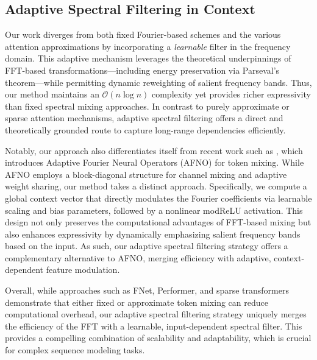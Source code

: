 \subsection{Adaptive Spectral Filtering in Context}
\label{subsec:adaptive_spectral_filtering_context}
Our work diverges from both fixed Fourier-based schemes and the various attention approximations by incorporating a \emph{learnable} filter in the frequency domain. This adaptive mechanism leverages the theoretical underpinnings of FFT-based transformations---including energy preservation via Parseval's theorem---while permitting dynamic reweighting of salient frequency bands. Thus, our method maintains an \(\mathcal{O}(n \log n)\) complexity yet provides richer expressivity than fixed spectral mixing approaches. In contrast to purely approximate or sparse attention mechanisms, adaptive spectral filtering offers a direct and theoretically grounded route to capture long-range dependencies efficiently.

Notably, our approach also differentiates itself from recent work such as \cite{guibas2022adaptivefourierneuraloperators}, which introduces Adaptive Fourier Neural Operators (AFNO) for token mixing. While AFNO employs a block-diagonal structure for channel mixing and adaptive weight sharing, our method takes a distinct approach. Specifically, we compute a global context vector that directly modulates the Fourier coefficients via learnable scaling and bias parameters, followed by a nonlinear modReLU activation. This design not only preserves the computational advantages of FFT-based mixing but also enhances expressivity by dynamically emphasizing salient frequency bands based on the input. As such, our adaptive spectral filtering strategy offers a complementary alternative to AFNO, merging efficiency with adaptive, context-dependent feature modulation.

Overall, while approaches such as FNet, Performer, and sparse transformers demonstrate that either fixed or approximate token mixing can reduce computational overhead, our adaptive spectral filtering strategy uniquely merges the efficiency of the FFT with a learnable, input-dependent spectral filter. This provides a compelling combination of scalability and adaptability, which is crucial for complex sequence modeling tasks.

